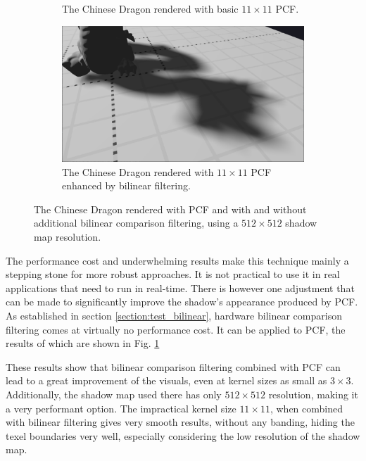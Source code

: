\begin{figure}[h]
\begin{subfigure}[t]{0.45\textwidth}
        \caption{The Chinese Dragon rendered with basic \(11\times 11\) PCF.}
    \end{subfigure}
	\hfill
    \begin{subfigure}[t]{0.45\textwidth}
		\centering
        \includegraphics[width=\textwidth]{./graf/tests/pcf/cropped/dragon_pcf_fhd_512_11x11_bilinear.png}
        \caption{The Chinese Dragon rendered with \(11\times 11\) PCF enhanced by bilinear filtering.}
    \end{subfigure}

    \caption{The Chinese Dragon rendered with PCF and with and without additional bilinear comparison filtering, using a \(512\times 512\) shadow map resolution.}
    \label{fig:test_pfc_bilinear_dragon_screens}
\end{figure}

The performance cost and underwhelming results make this technique mainly a stepping stone for more robust approaches. It is not practical to use it in real applications that need to run in real-time. There is however one adjustment that can be made to significantly improve the shadow's appearance produced by PCF. As established in section \ref{section:test_bilinear}, hardware bilinear comparison filtering comes at virtually no performance cost. It can be applied to PCF, the results of which are shown in Fig. \ref{fig:test_pfc_bilinear_dragon_screens}

These results show that bilinear comparison filtering combined with PCF can lead to a great improvement of the visuals, even at kernel sizes as small as \(3\times 3\). Additionally, the shadow map used there has only \(512\times 512\) resolution, making it a very performant option. The impractical kernel size \(11\times 11\), when combined with bilinear filtering gives very smooth results, without any banding, hiding the texel boundaries very well, especially considering the low resolution of the shadow map.


